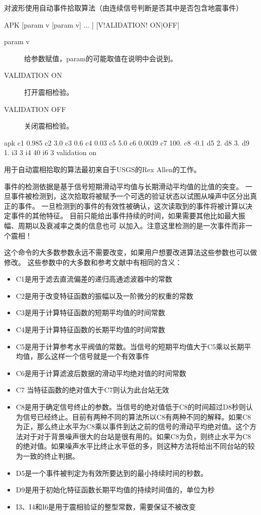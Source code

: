 \label{cmd:apk}

对波形使用自动事件拾取算法（由连续信号判断是否其中是否包含地震事件）

\begin{SACSTX}
APK [param v [param v] ... ] [V!ALIDATION! ON|OFF]
\end{SACSTX}

\begin{description}
\item [param v] 给参数赋值，param的可能取值在说明中会说到。
\item [VALIDATION ON] 打开震相检验。
\item [VALIDATION OFF] 关闭震相检验。
\end{description}

\begin{SACDFT}
apk c1 0.985 c2 3.0 c3 0.6 c4 0.03 c5 5.0 c6 0.0039 c7 100. c8 -0.1
    d5 2. d8 3. d9 1. i3 3 i4 40 i6 3 validation on
\end{SACDFT}

用于自动震相拾取的算法最初来自于USGS的Rex Allen的工作。

事件的检测依据是基于信号短期滑动平均值与长期滑动平均值的比值的突变。
一旦事件被检测到，这次拾取将被赋予一个可选的验证状态以试图从噪声中区分出真正的事件。
一旦检测到的事件的有效性被确认，这次读取到的事件将被计算以决定事件的其他特征。
目前只能给出事件持续的时间，如果需要其他比如最大振幅、周期以及衰减率之类的信息也可
以加入。注意这里检测的是一次事件而非一个震相！

这个命令的大多数参数永远不需要改变，如果用户想要改进算法这些参数也可以做修改。
这些参数中的大多数和参考文献中有相同的含义：
\begin{itemize}
\item C1是用于滤去直流偏差的递归高通滤波器中的常数
\item C2是用于改变特征函数的振幅以及一阶微分的权重的常数
\item C3是用于计算特征函数的短期平均值的时间常数
\item C4是用于计算特征函数的长期平均值的时间常数
\item C5是用于计算参考水平阀值的常数。当信号的短期平均值大于C5乘以长期平均值，那么这样一个信号就是一个有效事件
\item C6是用于计算滤波后数据的滑动平均绝对值的时间常数
\item C7 当特征函数的绝对值大于C7则认为此台站无效
\item C8是用于确定信号终止的参数。当信号的绝对值低于C8的时间超过D8秒则认为信号已经终止。目前有两种不同的算法所以C8有两种不同的解释。如果C8为正，那么终止水平为C8乘以事件到达之前的信号的滑动平均绝对值。这个方法对于对于背景噪声很大的台站是很有用的。如果C8为负，则终止水平为C8的绝对值。如果噪声水平比终止水平低的多，则这种方法将给出不同台站的较为一致的终止判据。
\item D5是一个事件被判定为有效所要达到的最小持续时间的秒数。
\item D9是用于初始化特征函数长期平均值的持续时间值的，单位为秒
\item I3、I4和I6是用于震相验证的整型常数，需要保证不被改变
\end{itemize}

